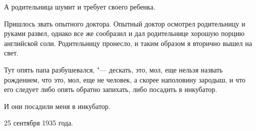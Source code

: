 А родительница шумит и требует своего ребенка.

Пришлось звать опытного доктора. Опытный доктор осмотрел родительницу и руками развел, однако все же сообразил и дал родительнице хорошую порцию английской соли. Родительницу пронесло, и таким образом я вторично вышел на свет.

Тут опять папа разбушевался, "--- дескать, это, мол, еще нельзя назвать рождением, что это, мол, еще не человек, а скорее наполовину зародыш, и что его следует либо опять обратно запихать, либо посадить в инкубатор.

И они посадили меня в инкубатор.

\begin{flushright}           25 сентября 1935 года.\end{flushright}